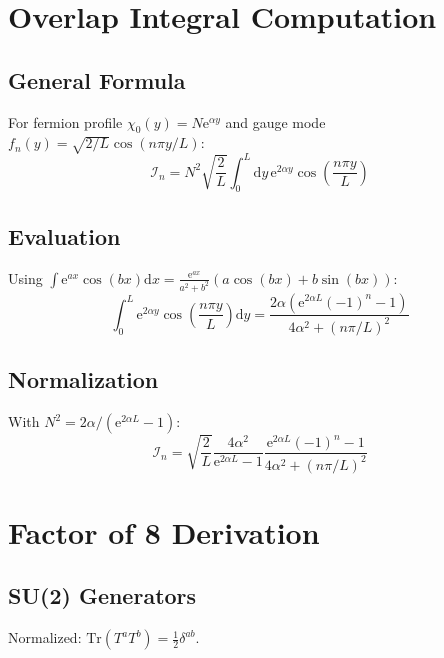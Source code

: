 \documentclass[11pt,a4paper]{article}
\newcommand{\Tr}{\mathrm{Tr}}
\newcommand{\dd}{\mathrm{d}}
\newcommand{\ee}{\mathrm{e}}
\begin{document}
\section{Overlap Integral Computation}
\label{app:overlap}

\subsection{General Formula}

For fermion profile $\chi_0(y) = N \ee^{\alpha y}$ and gauge mode $f_n(y) = \sqrt{2/L}\cos(n\pi y/L)$:
\begin{equation}
\mathcal{I}_n = N^2 \sqrt{\frac{2}{L}} \int_0^L \dd y\, \ee^{2\alpha y} \cos\left(\frac{n\pi y}{L}\right)
\label{eq:overlap-general}
\end{equation}

\subsection{Evaluation}

Using $\int \ee^{ax}\cos(bx)\dd x = \frac{\ee^{ax}}{a^2+b^2}(a\cos(bx) + b\sin(bx))$:
\begin{equation}
\int_0^L \ee^{2\alpha y}\cos\left(\frac{n\pi y}{L}\right)\dd y
= \frac{2\alpha(\ee^{2\alpha L}(-1)^n - 1)}{4\alpha^2 + (n\pi/L)^2}
\label{eq:overlap-eval}
\end{equation}

\subsection{Normalization}

With $N^2 = 2\alpha/(\ee^{2\alpha L} - 1)$:
\begin{equation}
\mathcal{I}_n = \sqrt{\frac{2}{L}} \frac{4\alpha^2}{\ee^{2\alpha L} - 1}
\frac{\ee^{2\alpha L}(-1)^n - 1}{4\alpha^2 + (n\pi/L)^2}
\label{eq:overlap-normalized}
\end{equation}

\section{Factor of 8 Derivation}
\label{app:factor8}

\subsection{SU(2) Generators}

Normalized: $\Tr(T^a T^b) = \frac{1}{2}\delta^{ab}$.
\end{document}
